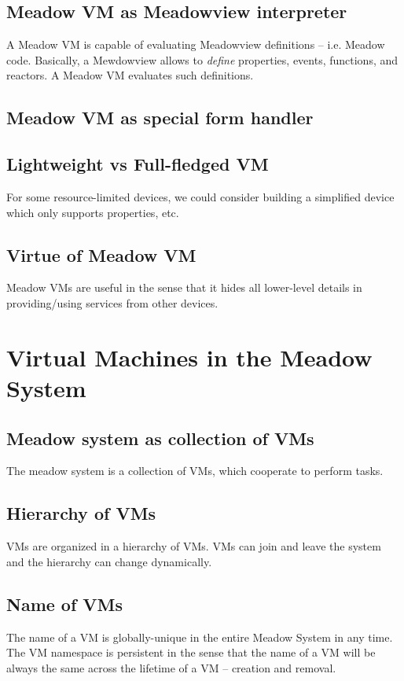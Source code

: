 \documentclass{note}
\begin{document}
\subsection{Meadow VM as Meadowview interpreter}
A Meadow VM is capable of evaluating Meadowview definitions -- i.e. Meadow
code. Basically, a Mewdowview allows to \textcolor{red2}{\em define\/}
properties, events, functions, and reactors.
A Meadow VM evaluates such definitions. 

\subsection{Meadow VM as special form handler}


\subsection{Lightweight vs Full-fledged VM}
For some resource-limited devices, we could consider building a simplified
device which only supports properties, etc.


\subsection{Virtue of Meadow VM}
Meadow VMs are useful in the sense that it hides all lower-level details in
providing/using services from other devices.



\section{Virtual Machines in the Meadow System}
\subsection{Meadow system as collection of VMs}
The meadow system is a collection of VMs, which cooperate to perform tasks. 

\subsection{Hierarchy of VMs}
VMs are organized in a hierarchy of VMs.
VMs can join and leave the system and the hierarchy can change dynamically.

\subsection{Name of VMs}
The name of a VM is globally-unique in the entire Meadow System in any time.
The VM namespace is persistent in the sense that the name of a VM will be
always the same across the lifetime of a VM -- creation and removal.
\end{document}
